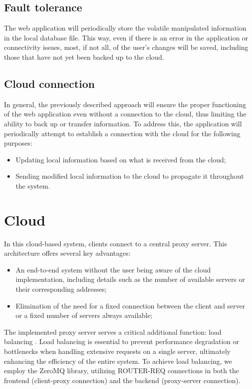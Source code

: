 \documentclass[sigconf, authorversion, nonacm]{acmart}
\begin{document}
\subsection{Fault tolerance}

The web application will periodically store the volatile manipulated information in the local database file. This way, even if there is an error in the application or connectivity issues, most, if not all, of the user's changes will be saved, including those that have not yet been backed up to the cloud.

\subsection{Cloud connection}

In general, the previously described approach will ensure the proper functioning of the web application even without a connection to the cloud, thus limiting the ability to back up or transfer information. To address this, the application will periodically attempt to establish a connection with the cloud for the following purposes:

\begin{itemize}
    \item Updating local information based on what is received from the cloud;
    \item Sending modified local information to the cloud to propagate it throughout the system.
\end{itemize}

\section{Cloud}

In this cloud-based system, clients connect to a central proxy server. This architecture offers several key advantages:

\begin{itemize}
    \item An end-to-end system without the user being aware of the cloud implementation, including details such as the number of available servers or their corresponding addresses;
    \item Elimination of the need for a fixed connection between the client and server or a fixed number of servers always available;
\end{itemize}

The implemented proxy server serves a critical additional function: load balancing \cite{loadbalancer}. Load balancing is essential to prevent performance degradation or bottlenecks when handling extensive requests on a single server, ultimately enhancing the efficiency of the entire system. To achieve load balancing, we employ the ZeroMQ library, utilizing ROUTER-REQ connections in both the frontend (client-proxy connection) and the backend (proxy-server connection).
\end{document}
